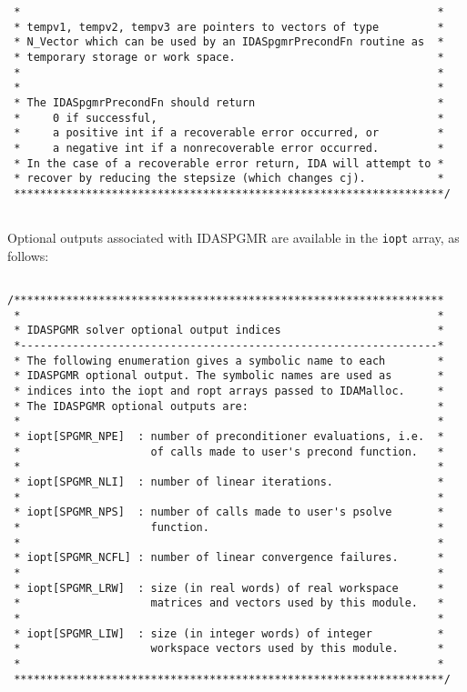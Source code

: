 \begin{verbatim}
 *                                                                *
 * tempv1, tempv2, tempv3 are pointers to vectors of type         *
 * N_Vector which can be used by an IDASpgmrPrecondFn routine as  *
 * temporary storage or work space.                               *
 *                                                                *
 *                                                                *
 * The IDASpgmrPrecondFn should return                            *
 *     0 if successful,                                           *
 *     a positive int if a recoverable error occurred, or         *
 *     a negative int if a nonrecoverable error occurred.         *
 * In the case of a recoverable error return, IDA will attempt to *
 * recover by reducing the stepsize (which changes cj).           *
 ******************************************************************/
  
\end{verbatim}
\normalsize

Optional outputs associated with IDASPGMR are available in the 
{\tt iopt} array, as follows:

\small
\begin{verbatim}

/******************************************************************
 *                                                                *
 * IDASPGMR solver optional output indices                        *
 *----------------------------------------------------------------*
 * The following enumeration gives a symbolic name to each        *
 * IDASPGMR optional output. The symbolic names are used as       *
 * indices into the iopt and ropt arrays passed to IDAMalloc.     *
 * The IDASPGMR optional outputs are:                             *
 *                                                                *
 * iopt[SPGMR_NPE]  : number of preconditioner evaluations, i.e.  *
 *                    of calls made to user's precond function.   *
 *                                                                *
 * iopt[SPGMR_NLI]  : number of linear iterations.                *
 *                                                                *
 * iopt[SPGMR_NPS]  : number of calls made to user's psolve       *
 *                    function.                                   *
 *                                                                *
 * iopt[SPGMR_NCFL] : number of linear convergence failures.      *
 *                                                                *
 * iopt[SPGMR_LRW]  : size (in real words) of real workspace      *
 *                    matrices and vectors used by this module.   *
 *                                                                *
 * iopt[SPGMR_LIW]  : size (in integer words) of integer          *
 *                    workspace vectors used by this module.      *
 *                                                                *
 ******************************************************************/
 
\end{verbatim}
\normalsize

